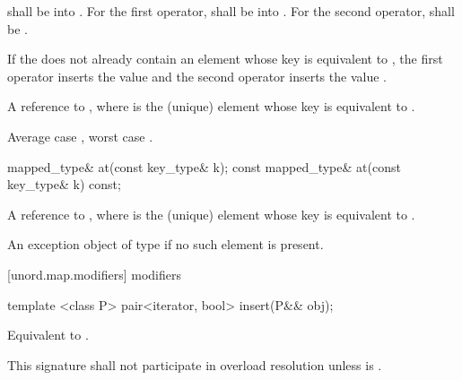 \begin{itemdescr}
\pnum
\requires {} shall be  into .
For the first operator,  shall be  into .
For the second operator,  shall be .

\pnum
\effects If the  does not already contain
an element whose key is equivalent to , the first operator inserts
the value
and the second operator inserts the value
.


\pnum
\returns A reference to , where 
is the (unique) element whose key is equivalent to .

\pnum
\complexity Average case , worst case .
\end{itemdescr}

%
%
%
\begin{itemdecl}
mapped_type& at(const key_type& k);
const mapped_type& at(const key_type& k) const;
\end{itemdecl}

\begin{itemdescr}
\pnum
\returns A reference to , where  is the (unique) element whose key is equivalent to .

\pnum
\throws An exception object of type  if no such element is present.
\end{itemdescr}

[unord.map.modifiers]{ modifiers}

%
%
\begin{itemdecl}
template <class P>
  pair<iterator, bool> insert(P&& obj);
\end{itemdecl}

\begin{itemdescr}
\pnum
\effects Equivalent to . 

\pnum
\remarks This signature shall not participate in overload resolution
unless  is .
\end{itemdescr}

